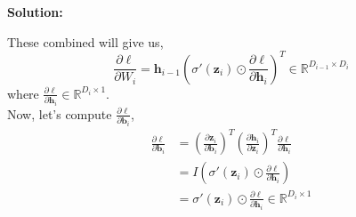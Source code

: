 \documentclass{article}
\newenvironment{solution}
  {\par\noindent\textbf{Solution:}\par}
  {\par}
\begin{document}
\begin{solution}
  These combined will give us,
  $$ \frac{\partial \ell}{\partial W_i} =\textbf{h}_{i-1} \left( \sigma'(\textbf{z}_i) \odot \frac{\partial \ell}{\partial \textbf{h}_i} \right) ^T \in \mathbb{R}^{D_{i-1} \times D_{i}} $$
  where $\frac{\partial \ell}{\partial \textbf{h}_i} \in \mathbb{R}^{D_i \times 1}$. \\ 
  Now, let's compute $\frac{\partial \ell}{\partial \textbf{b}_i}$, 
  \[
    \begin{aligned}
      \frac{\partial \ell}{\partial \textbf{b}_i} &= \left(\frac{\partial \textbf{z}_i}{\partial \textbf{b}_i} \right)^T \left( \frac{\partial \textbf{h}_i}{\partial \textbf{z}_i}\right)^T \frac{\partial \ell}{\partial \textbf{h}_i}  \\ 
                                                  &= I \left( \sigma'(\textbf{z}_i) \odot \frac{\partial \ell}{\partial \textbf{h}_i} \right) \\ 
                                                  &= \sigma'(\textbf{z}_i) \odot \frac{\partial \ell}{\partial \textbf{h}_i} \in \mathbb{R}^{D_i \times 1 }
    \end{aligned}
    \]
\end{solution}
\end{document}
